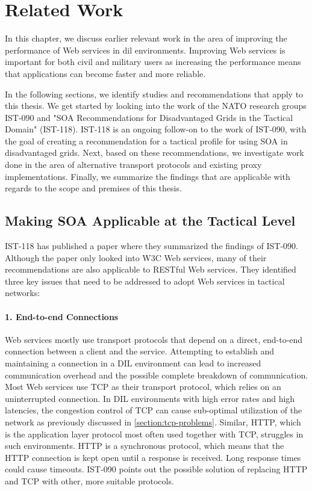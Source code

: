 \chapter{Related Work}
\label{chapter:related-work}


In this chapter, we discuss earlier relevant work in the area of improving the
performance of Web services in \gls{dil} environments. Improving Web services is
important for both civil and military users as increasing the performance means
that applications can become faster and more reliable.

In the following sections, we identify studies and recommendations that apply to
this thesis. We get started by looking into the work of the NATO research groups
IST-090 and "SOA Recommendations for Disadvantaged Grids in the Tactical Domain"
(IST-118). IST-118 is an ongoing follow-on to the work of IST-090, with the goal
of creating a recommendation for a tactical profile for using SOA in
disadvantaged grids. Next, based on these recommendations, we investigate work
done in the area of alternative transport protocols and existing proxy
implementations.  Finally, we summarize the findings that are applicable with
regards to the scope and premises of this thesis.

\section{Making SOA Applicable at the Tactical Level}

IST-118 has published a paper\cite{ist-118} where they summarized the findings
of IST-090. Although the paper only looked into W3C Web services, many of their
recommendations are also applicable to RESTful Web services. They identified
three key issues that need to be addressed to adopt Web services in tactical
networks:

\label{section:DIL-problems}

\subsubsection{1. End-to-end Connections}

Web services mostly use transport protocols that depend on a direct, end-to-end
connection between a client and the service. Attempting to establish and
maintaining a connection in a DIL environment can lead to increased communication
overhead and the possible complete breakdown of communication. Most Web services use
TCP as their transport protocol, which relies on an uninterrupted connection.
In DIL environments with high error rates and high latencies,
the congestion control of TCP can cause sub-optimal utilization of the network
as previously discussed in \cref{section:tcp-problems}. Similar, HTTP, which is
the application layer protocol most often used together with TCP, struggles in
such environments. HTTP is a synchronous protocol, which means that the HTTP
connection is kept open until a response is received. Long response times could cause
timeouts. IST-090 points out the possible solution of replacing HTTP and TCP with
other, more suitable protocols.

